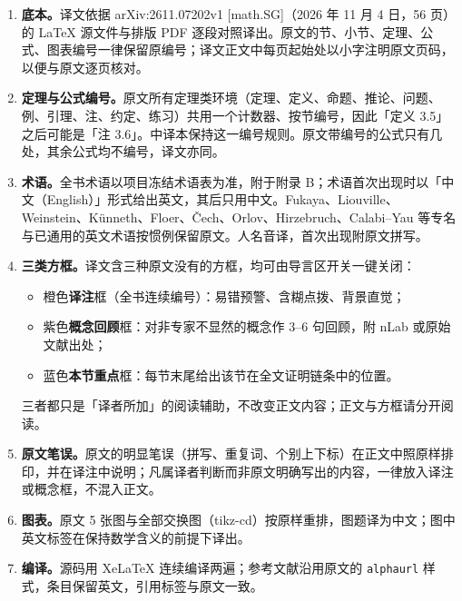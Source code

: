 \begin{enumerate}[label=（\arabic*）,leftmargin=2.4em,itemsep=0.35em]
  \item \textbf{底本。}译文依据 arXiv:2611.07202v1 [math.SG]（2026 年 11 月 4 日，56 页）的 LaTeX 源文件与排版 PDF 逐段对照译出。原文的节、小节、定理、公式、图表编号一律保留原编号；译文正文中每页起始处以小字注明原文页码，以便与原文逐页核对。
  \item \textbf{定理与公式编号。}原文所有定理类环境（定理、定义、命题、推论、问题、例、引理、注、约定、练习）共用一个计数器、按节编号，因此「定义 3.5」之后可能是「注 3.6」。中译本保持这一编号规则。原文带编号的公式只有几处，其余公式均不编号，译文亦同。
  \item \textbf{术语。}全书术语以项目冻结术语表为准，附于附录 B；术语首次出现时以「中文（English）」形式给出英文，其后只用中文。Fukaya、Liouville、Weinstein、Künneth、Floer、Čech、Orlov、Hirzebruch、Calabi--Yau 等专名与已通用的英文术语按惯例保留原文。人名音译，首次出现附原文拼写。
  \item \textbf{三类方框。}译文含三种原文没有的方框，均可由导言区开关一键关闭：
    \begin{itemize}[leftmargin=1.2em,itemsep=0.1em]
      \item 橙色\textbf{译注}框（全书连续编号）：易错预警、含糊点拨、背景直觉；
      \item 紫色\textbf{概念回顾}框：对非专家不显然的概念作 3--6 句回顾，附 nLab 或原始文献出处；
      \item 蓝色\textbf{本节重点}框：每节末尾给出该节在全文证明链条中的位置。
    \end{itemize}
    三者都只是「译者所加」的阅读辅助，不改变正文内容；正文与方框请分开阅读。
  \item \textbf{原文笔误。}原文的明显笔误（拼写、重复词、个别上下标）在正文中照原样排印，并在译注中说明；凡属译者判断而非原文明确写出的内容，一律放入译注或概念框，不混入正文。
  \item \textbf{图表。}原文 5 张图与全部交换图（tikz-cd）按原样重排，图题译为中文；图中英文标签在保持数学含义的前提下译出。
  \item \textbf{编译。}源码用 XeLaTeX 连续编译两遍；参考文献沿用原文的 \texttt{alphaurl} 样式，条目保留英文，引用标签与原文一致。
\end{enumerate}

\vspace{0.5em}

\clearpage
\tableofcontents
\clearpage
